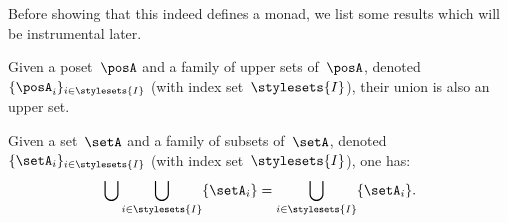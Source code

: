 Before showing that this indeed defines a monad, we list some results which will be instrumental later.
\begin{lemma}
	\label{lem:upperunionupper}
	Given a poset~$\posA$ and a family of upper sets of~$\posA$, denoted~$\{\posA_i\}_{i\in \stylesets{I}}$ (with index set~$\stylesets{I}$), their union is also an upper set.
\end{lemma}

\begin{lemma}
	\label{lem:setunionset}
	Given a set~$\setA$ and a family of subsets of~$\setA$, denoted~$\{\setA_i\}_{i\in \stylesets{I}}$ (with index set~$\stylesets{I}$), one has:
	\begin{equation}
		\bigcup \bigcup_{i\in \stylesets{I}}\{\setA_i\} = \bigcup_{i\in \stylesets{I}}\{\setA_i\}.
	\end{equation}
\end{lemma}

